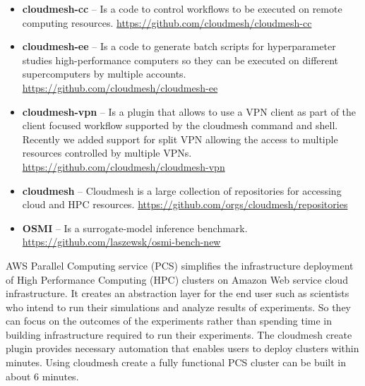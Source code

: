 \documentclass[utf8]{FrontiersinVancouver} %
\begin{document}
\begin{itemize}

\item {\bf cloudmesh-cc} -- Is a code to control workflows to be executed on
  remote computing
  resources. \url{https://github.com/cloudmesh/cloudmesh-cc}

\item {\bf cloudmesh-ee} -- Is a code to generate batch scripts for
  hyperparameter studies high-performance computers so they can be
  executed on different supercomputers by multiple
  accounts. \url{https://github.com/cloudmesh/cloudmesh-ee}


\item {\bf cloudmesh-vpn} -- Is a plugin that allows to use a VPN client as part of the client focused workflow supported by the cloudmesh command and shell. Recently we added support for split VPN allowing the access to multiple resources controlled by multiple VPNs.
\url{https://github.com/cloudmesh/cloudmesh-vpn}

\item {\bf cloudmesh} -- Cloudmesh is a large collection of repositories for
  accessing cloud and HPC
  resources. \url{https://github.com/orgs/cloudmesh/repositories}

\item {\bf OSMI} -- Is a surrogate-model inference benchmark. \url{https://github.com/laszewsk/osmi-bench-new}



\end{itemize}

AWS Parallel Computing service (PCS) simplifies the infrastructure deployment of High Performance Computing (HPC) clusters on Amazon Web service cloud infrastructure. \citep{awspcs} It creates an abstraction layer for the end user such as scientists who intend to run their simulations and analyze results of experiments. So they can focus on the outcomes of the experiments rather than spending time in building infrastructure required to run their experiments. The cloudmesh create plugin provides necessary automation that enables users to deploy clusters within minutes. Using cloudmesh create a fully functional PCS cluster can be  built in about 6 minutes. 
\end{document}
